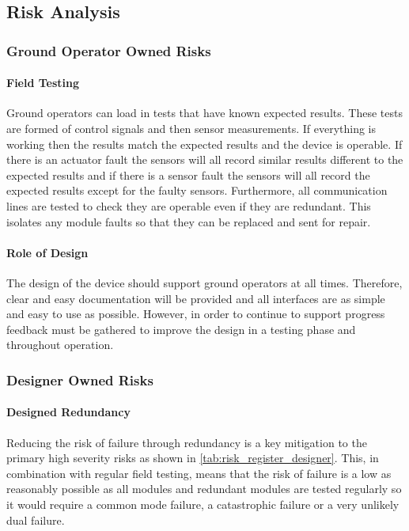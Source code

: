 \subsection{Risk Analysis}
\subsubsection{Ground Operator Owned Risks}
 
\paragraph{Field Testing}
Ground operators can load in tests that have known expected results. These tests are formed of control signals and then sensor measurements. If everything is working then the results match the expected results and the device is operable. If there is an actuator fault the sensors will all record similar results different to the expected results and if there is a sensor fault the sensors will all record the expected results except for the faulty sensors. Furthermore, all communication lines are tested to check they are operable even if they are redundant. This isolates any module faults so that they can be replaced and sent for repair.
\paragraph{Role of Design}
The design of the device should support ground operators at all times. Therefore, clear and easy documentation will be provided and all interfaces are as simple and easy to use as possible. However, in order to continue to support progress feedback must be gathered to improve the design in a testing phase and throughout operation.

\subsubsection{Designer Owned Risks}
 
\paragraph{Designed Redundancy}
Reducing the risk of failure through redundancy is a key mitigation to the primary high severity risks as shown in \ref{tab:risk_register_designer}. This, in combination with regular field testing, means that the risk of failure is a low as reasonably possible as all modules and redundant modules are tested regularly so it would require a common mode failure, a catastrophic failure or a very unlikely dual failure.
